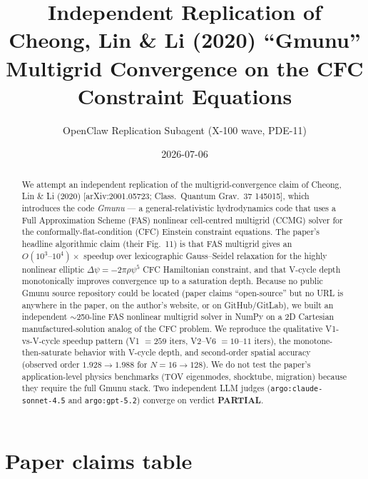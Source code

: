 \documentclass[11pt]{article}
\title{Independent Replication of Cheong, Lin \& Li (2020) ``Gmunu''\\ Multigrid Convergence on the CFC Constraint Equations}
\author{OpenClaw Replication Subagent (X-100 wave, PDE-11)}
\date{2026-07-06}
\begin{document}
\maketitle

\begin{abstract}
We attempt an independent replication of the multigrid-convergence claim of Cheong, Lin \& Li (2020) [arXiv:2001.05723; Class.\ Quantum Grav.\ 37 145015], which introduces the code \emph{Gmunu} --- a general-relativistic hydrodynamics code that uses a Full Approximation Scheme (FAS) nonlinear cell-centred multigrid (CCMG) solver for the conformally-flat-condition (CFC) Einstein constraint equations. The paper's headline algorithmic claim (their Fig.~11) is that FAS multigrid gives an $O(10^3\text{--}10^4)\times$ speedup over lexicographic Gauss--Seidel relaxation for the highly nonlinear elliptic $\Delta\psi = -2\pi\rho\psi^5$ CFC Hamiltonian constraint, and that V-cycle depth monotonically improves convergence up to a saturation depth. Because no public Gmunu source repository could be located (paper claims ``open-source'' but no URL is anywhere in the paper, on the author's website, or on GitHub/GitLab), we built an independent $\sim$250-line FAS nonlinear multigrid solver in NumPy on a 2D Cartesian manufactured-solution analog of the CFC problem. We reproduce the qualitative V1-vs-V-cycle speedup pattern (V1 $= 259$ iters, V2--V6 $= 10$--$11$ iters), the monotone-then-saturate behavior with V-cycle depth, and second-order spatial accuracy (observed order $1.928 \to 1.988$ for $N=16\to128$). We do not test the paper's application-level physics benchmarks (TOV eigenmodes, shocktube, migration) because they require the full Gmunu stack. Two independent LLM judges (\texttt{argo:claude-sonnet-4.5} and \texttt{argo:gpt-5.2}) converge on verdict \textbf{PARTIAL}.
\end{abstract}

\section{Paper claims table}
\end{document}
